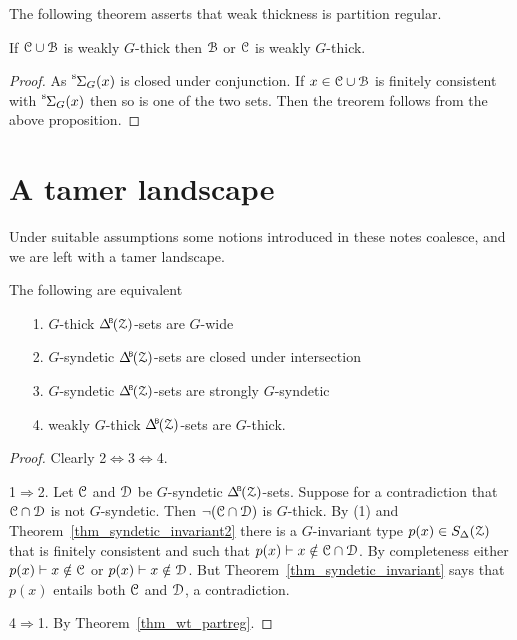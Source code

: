 The following theorem asserts that weak thickness is partition regular.

\begin{theorem}\label{thm_wt_partreg}
  If $\EuScript C\cup\EuScript B$ is weakly $G$-thick then $\EuScript B$ or $\EuScript C$ is weakly $G$-thick.
\end{theorem}

\begin{proof}
  As ${\mathstrut}^{\rm s}\kern-.1ex\Sigma_G(x)$ is closed under conjunction.
  If $x\in \EuScript C\cup\EuScript B$ is finitely consistent with ${\mathstrut}^{\rm s}\kern-.1ex\Sigma_G(x)$ then so is one of the two sets.
  Then the treorem follows from the above proposition.
\end{proof}

\section{A tamer landscape}\label{tame_landscape}

Under suitable assumptions some notions introduced in these notes coalesce, and we are left with a tamer landscape.

\begin{theorem}\label{thm_coalesce}
  The following are equivalent
  \begin{itemize}
    \item[1.] $G$-thick $\BDelta({\Z})$-sets are $G$-wide
    \item[2.] $G$-syndetic $\BDelta({\Z})$-sets are closed under intersection 
    \item[3.] $G$-syndetic $\BDelta({\Z})$-sets are strongly $G$-syndetic
    \item[4.] weakly $G$-thick $\BDelta({\Z})$-sets are $G$-thick.
  \end{itemize}
\end{theorem}

\begin{proof}
  Clearly 2$\Leftrightarrow$3$\Leftrightarrow$4.

  1$\Rightarrow$2.
  Let $\EuScript C$ and $\EuScript D$ be $G$-syndetic $\BDelta({\Z})$-sets.
  Suppose for a contradiction that $\EuScript C\cap\EuScript D$ is not $G$-syndetic.
  Then $\neg(\EuScript C\cap\EuScript D)$ is $G$-thick.
  By (1) and Theorem~\ref{thm_syndetic_invariant2} there is a $G$-invariant type $p(x)\in S_\Delta(\EuScript Z)$ that is finitely consistent and such that $p(x)\vdash x\notin\EuScript C\cap\EuScript D$.
  By completeness either $p(x)\vdash x\notin\EuScript C$ or $p(x)\vdash x\notin\EuScript D$.
  But Theorem~\ref{thm_syndetic_invariant} says that $p(x)$ entails both $\EuScript C$ and $\EuScript D$, a contradiction.


  4$\Rightarrow$1. By Theorem~\ref{thm_wt_partreg}.
\end{proof}

